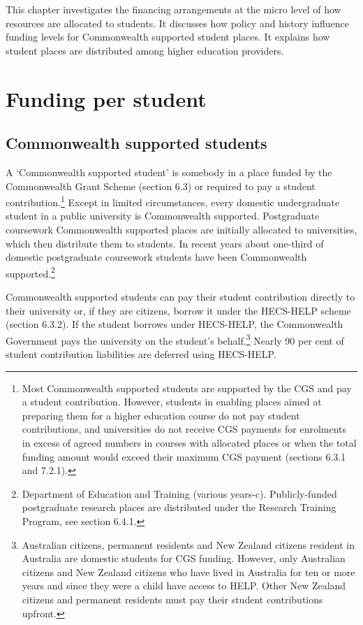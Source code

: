 \documentclass[]{book}
\begin{document}
This chapter investigates the financing arrangements at the micro level of how resources are allocated to students. It discusses how policy and history influence funding levels for Commonwealth supported student places. It explains how student places are distributed among higher education providers.

\hypertarget{funding-per-student}{%
\section{Funding per student}\label{funding-per-student}}

\hypertarget{commonwealth-supported-students}{%
\subsection{Commonwealth supported students}\label{commonwealth-supported-students}}

A `Commonwealth supported student' is somebody in a place funded by the Commonwealth Grant Scheme (section 6.3) or required to pay a student contribution.\footnote{Most Commonwealth supported students are supported by the CGS and pay a student contribution. However, students in enabling places aimed at preparing them for a higher education course do not pay student contributions, and universities do not receive CGS payments for enrolments in excess of agreed numbers in courses with allocated places or when the total funding amount would exceed their maximum CGS payment (sections 6.3.1 and 7.2.1).} Except in limited circumstances, every domestic undergraduate student in a public university is Commonwealth supported. Postgraduate coursework Commonwealth supported places are initially allocated to universities, which then distribute them to students. In recent years about one-third of domestic postgraduate coursework students have been Commonwealth supported.\footnote{Department of Education and Training (various years-c). Publicly-funded postgraduate research places are distributed under the Research Training Program, see section 6.4.1.}

Commonwealth supported students can pay their student contribution directly to their university or, if they are citizens, borrow it under the HECS-HELP scheme (section 6.3.2). If the student borrows under HECS-HELP, the Commonwealth Government pays the university on the student's behalf.\footnote{Australian citizens, permanent residents and New Zealand citizens resident in Australia are domestic students for CGS funding. However, only Australian citizens and New Zealand citizens who have lived in Australia for ten or more years and since they were a child have access to HELP. Other New Zealand citizens and permanent residents must pay their student contributions upfront.} Nearly 90 per cent of student contribution liabilities are deferred using HECS-HELP.
\end{document}
